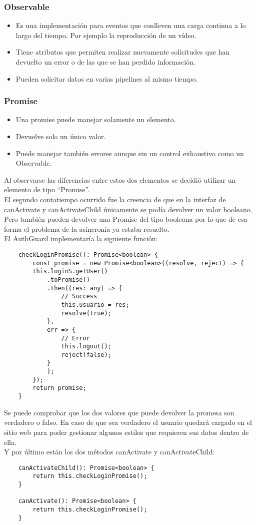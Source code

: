 \subsubsection{Observable}
\begin{itemize}
    \item Es una implementación para eventos que conlleven una carga continua a lo largo del tiempo. Por ejemplo la reproducción de un vídeo.
    \item Tiene atributos que permiten realizar nuevamente solicitudes que han devuelto un error o de las que se han perdido información.
    \item Pueden solicitar datos en varias pipelines al mismo tiempo.
\end{itemize}

\subsubsection{Promise}
\begin{itemize}
    \item Una promise puede manejar solamente un elemento.
    \item Devuelve solo un único valor.
    \item Puede manejar también errores aunque sin un control exhaustivo como un Observable.
\end{itemize}

Al observarse las diferencias entre estos dos elementos se decidió utilizar un elemento de tipo ``Promise''.
\\El segundo contatiempo ocurrido fue la creencia de que en la interfaz de canActivate y canActivateChild únicamente se podía devolver un valor booleano. Pero también pueden devolver una Promise del tipo booleana por lo que de esa forma el problema de la asincronía ya estaba resuelto.
\\El AuthGuard implementaría la siguiente función:
\begin{verbatim}
    checkLoginPromise(): Promise<boolean> {
        const promise = new Promise<boolean>((resolve, reject) => {
        this.loginS.getUser()
            .toPromise()
            .then((res: any) => {
                // Success
                this.usuario = res;
                resolve(true);
            },
            err => {
                // Error
                this.logout();
                reject(false);
            }
            );
        });
        return promise;
    }
\end{verbatim}
Se puede comprobar que los dos valores que puede devolver la promesa son verdadero o falso. En caso de que sea verdadero el usuario quedará cargado en el sitio web para poder gestionar algunos estilos que requieren sus datos dentro de ella.
\\Y por último están los dos métodos canActivate y canActivateChild:
\begin{verbatim}
    canActivateChild(): Promise<boolean> {
        return this.checkLoginPromise();
    }

    canActivate(): Promise<boolean> {
        return this.checkLoginPromise();
    }
\end{verbatim}



